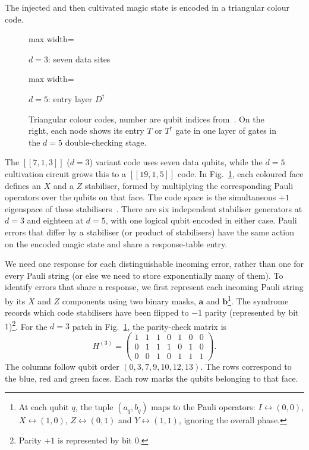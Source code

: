 The injected and then cultivated magic state is encoded in a triangular colour code.
\begin{figure}%
\centering
\begin{minipage}[c]{.38\linewidth}\centering
\begin{adjustbox}{max width=\linewidth}\end{adjustbox}
\par\smallskip $d=3$: seven data sites
\end{minipage}\hfill
\begin{minipage}[c]{.58\linewidth}\centering
\begin{adjustbox}{max width=\linewidth}\end{adjustbox}
\par\smallskip $d=5$: entry layer $D^\dagger$
\end{minipage}
\caption{Triangular colour codes, number are qubit indices from~\cite{clifft, soft}. On the right, each node shows its entry $T$ or $T^\dagger$ gate in one layer of gates in the $d=5$ double-checking stage.}
\label{fig:patches}
\end{figure}
The $[[7,1,3]]$ ($d=3$) variant code uses seven data qubits, while the $d=5$ cultivation circuit
grows this to a $[[19,1,5]]$ code. In Fig.~\ref{fig:patches}, each coloured face defines an
$X$ and a $Z$ stabiliser, formed by multiplying the corresponding
Pauli operators over the qubits on that face. The code space is the
simultaneous $+1$ eigenspace of these stabilisers~\cite{albert2026handbookerrorcorrectingcodes}. There are six
independent stabiliser generators at $d=3$ and eighteen at $d=5$,
with one logical qubit encoded in either case. Pauli errors that differ by a stabiliser (or product of stabilisers) have the same action
on the encoded magic state and share a response-table entry.

We need one response for each distinguishable incoming error, rather than
one for every Pauli string (or else we need to store exponentially many of them). 
To identify errors that share a response, we first represent each
incoming Pauli string by its $X$ and $Z$ components using two binary
masks, $\boldsymbol a$ and $\boldsymbol b$\footnote{At each qubit $q$,
the tuple $(a_q,b_q)$ maps to the Pauli operators:
$I\leftrightarrow(0,0)$,
$X\leftrightarrow(1,0)$,
$Z\leftrightarrow(0,1)$ and
$Y\leftrightarrow(1,1)$, ignoring the overall phase.}. 
The syndrome records which code stabilisers have been flipped to $-1$ parity (represented by bit $1$)\footnote{Parity $+1$ is represented by bit $0$.}.
For the $d=3$ patch in Fig.~\ref{fig:patches}, the parity-check matrix is
\begin{equation}
 H^{(3)}=
 \begin{pmatrix}
 1&1&1&0&1&0&0\\
 0&1&1&1&0&1&0\\
 0&0&1&0&1&1&1
 \end{pmatrix}.
\end{equation}
The columns follow qubit order $(0,\allowbreak3,\allowbreak7,\allowbreak9,\allowbreak10,\allowbreak12,\allowbreak13)$. The rows correspond to the blue, red and green faces.
Each row marks the qubits belonging to that face.

